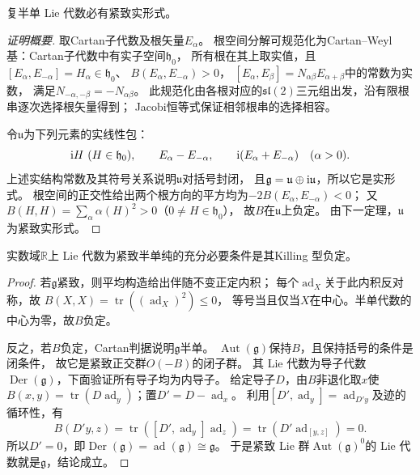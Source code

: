 \begin{theorem}
    复半单 Lie 代数必有紧致实形式。
\end{theorem}
\begin{proof}[证明概要]
取Cartan子代数及根矢量$E_\alpha$。
根空间分解可规范化为Cartan--Weyl基：Cartan子代数中有实子空间$\mathfrak h_0$，
所有根在其上取实值，且
$[E_\alpha,E_{-\alpha}]=H_\alpha\in\mathfrak h_0$、
$B(E_\alpha,E_{-\alpha})>0$，
$[E_\alpha,E_\beta]=N_{\alpha\beta}E_{\alpha+\beta}$中的常数为实数，
满足$N_{-\alpha,-\beta}=-N_{\alpha\beta}$。
此规范化由各根对应的$\mathfrak{sl}(2)$三元组出发，沿有限根串逐次选择根矢量得到；
Jacobi恒等式保证相邻根串的选择相容。

令$\mathfrak u$为下列元素的实线性包：
\[
 \mathrm{i} H\ (H\in\mathfrak h_0),\qquad
 E_\alpha-E_{-\alpha},\qquad
 \mathrm{i}(E_\alpha+E_{-\alpha})\quad(\alpha>0).
\]
上述实结构常数及其符号关系说明$\mathfrak u$对括号封闭，
且$\mathfrak g=\mathfrak u\oplus\mathrm{i}\mathfrak u$，所以它是实形式。
根空间的正交性给出两个根方向的平方均为$-2B(E_\alpha,E_{-\alpha})<0$；
又$B(H,H)=\sum_\alpha\alpha(H)^2>0$（$0\ne H\in\mathfrak h_0$），
故$B$在$\mathfrak u$上负定。
由下一定理，$\mathfrak u$为紧致实形式。
\end{proof}

\begin{theorem}
    实数域$\mathbb{R}$上 Lie 代数为{紧致半单纯}的充分必要条件是其Killing 型负定。
\end{theorem}
\begin{proof}
若$\mathfrak g$紧致，则平均构造给出伴随不变正定内积；
每个$\operatorname{ad}_X$关于此内积反对称，故
$B(X,X)=\operatorname{tr}((\operatorname{ad}_X)^2)\leqslant0$，
等号当且仅当$X$在中心。半单代数的中心为零，故$B$负定。

反之，若$B$负定，Cartan判据说明$\mathfrak g$半单。
$\operatorname{Aut}(\mathfrak g)$保持$B$，且保持括号的条件是闭条件，
故它是紧致正交群$O(-B)$的闭子群。
其 Lie 代数为导子代数$\operatorname{Der}(\mathfrak g)$，下面验证所有导子均为内导子。
给定导子$D$，由$B$非退化取$x$使
$B(x,y)=\operatorname{tr}(D\operatorname{ad}_y)$；置$D'=D-\operatorname{ad}_x$。
利用$[D',\operatorname{ad}_y]=\operatorname{ad}_{D'y}$及迹的循环性，有
\[
 B(D'y,z)=\operatorname{tr}([D',\operatorname{ad}_y]\operatorname{ad}_z)
 =\operatorname{tr}(D'\operatorname{ad}_{[y,z]})=0 .
\]
所以$D'=0$，即$\operatorname{Der}(\mathfrak g)=\operatorname{ad}(\mathfrak g)\cong\mathfrak g$。
于是紧致 Lie 群$\operatorname{Aut}(\mathfrak g)^0$的 Lie 代数就是$\mathfrak g$，结论成立。
\end{proof}

